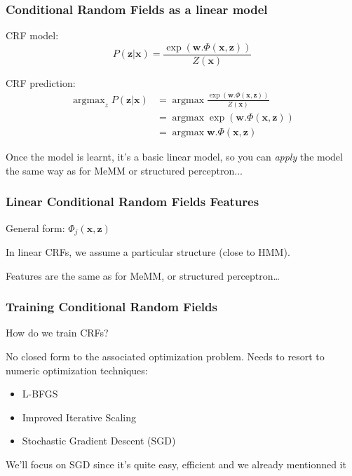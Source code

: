 \documentclass[usenames,dvipsnames]{beamer}
\DeclareMathOperator*{\argmax}{argmax}
\newcommand{\x}{\mathbf{x}}
\newcommand{\w}{\mathbf{w}}
\newcommand{\z}{\mathbf{z}}
\begin{document}
\begin{frame}\frametitle{Conditional Random Fields as a linear model}

CRF model:
\begin{equation*}
P(\z|\x) = \frac{\exp(\w . \Phi(\x,\z))}{Z(\x)}
\end{equation*}

\vspace{0.4cm}
CRF prediction:
\begin{align*}
\argmax_z P(\z|\x) &= \argmax \frac{\exp(\w . \Phi(\x,\z))}{Z(\x)} \\
                               &= \argmax \exp(\w . \Phi(\x,\z)) \\
                               &= \argmax \w . \Phi(\x,\z)
\end{align*}

\vspace{0.4cm} Once the model is learnt, it's a basic linear model, so
you can \emph{apply} the model the same way as for MeMM or structured
perceptron...

\end{frame}

\begin{frame}\frametitle{Linear Conditional Random Fields Features}

General form: $\Phi_j(\x,\z)$

\vspace{0.4cm}
In linear CRFs, we assume a particular structure (close to HMM).

\vspace{0.4cm}
Features are the same as for MeMM, or structured perceptron\dots


\end{frame}



\begin{frame}\frametitle{Training Conditional Random Fields}

How do we train CRFs?

\vspace{0.4cm}
No closed form to the associated optimization problem.  Needs to
resort to numeric optimization techniques:
\begin{itemize}
\item L-BFGS
\item Improved Iterative Scaling
\item Stochastic Gradient Descent (SGD)
\end{itemize}

\vspace{0.4cm}
We'll focus on SGD since it's quite easy, efficient and we already mentionned it
\end{frame}
\end{document}
